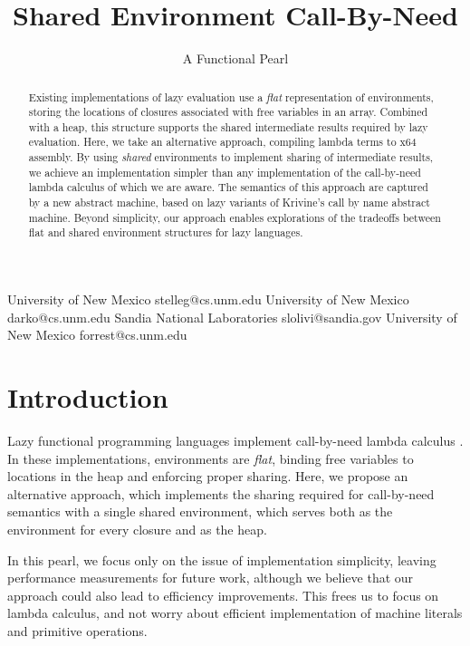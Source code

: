 \documentclass[preprint]{sigplanconf}
\begin{document}
\title{Shared Environment Call-By-Need}
\subtitle{A Functional Pearl}

           {University of New Mexico}
           {stelleg@cs.unm.edu}
           {University of New Mexico}
           {darko@cs.unm.edu}
           {Sandia National Laboratories}
           {slolivi@sandia.gov}
           {University of New Mexico}
           {forrest@cs.unm.edu}

\maketitle

\begin{abstract}
Existing implementations of lazy evaluation use a \emph{flat} representation
of environments, storing the locations of closures associated with free
variables in an array. Combined with a heap, this structure supports the
shared intermediate results required by lazy evaluation.  Here, we take an
alternative approach, compiling lambda terms to x64 assembly. By using
\emph{shared} environments to implement sharing of intermediate results, we
achieve an implementation simpler than any implementation of the call-by-need
lambda calculus of which we are aware. The semantics of this approach are
captured by a new abstract machine, based on lazy variants of Krivine's call by
name abstract machine. Beyond simplicity, our approach enables explorations of
the tradeoffs between flat and shared environment structures for lazy languages.
\end{abstract}

\section{Introduction} \label{sec:intro}

Lazy functional programming languages implement call-by-need lambda calculus
\cite{ariola1995call}. In these implementations, environments are \emph{flat},
binding free variables to locations in the heap and enforcing proper sharing.
Here, we propose an alternative approach, which implements the sharing required
for call-by-need semantics with a single shared environment, which serves both
as the environment for every closure and as the heap. 

In this pearl, we focus only on the issue of implementation simplicity, leaving
performance measurements for future work, although we believe that our approach
could also lead to efficiency improvements. This frees us to focus on lambda
calculus, and not worry about efficient implementation of machine literals and
primitive operations. 
\end{document}
